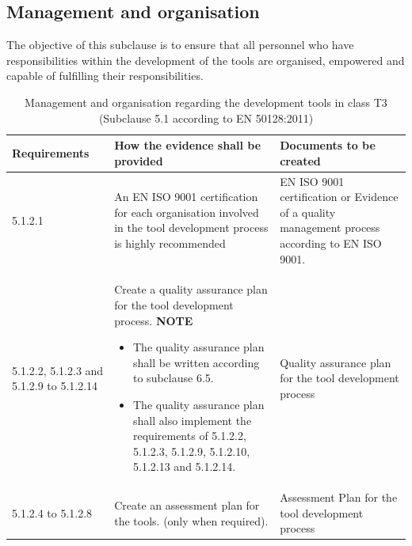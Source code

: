 \documentclass{template/openetcs_report}
\begin{document}
\subsection{Management and organisation}
The objective of this subclause is to ensure that all personnel who have responsibilities within the development of the tools are organised, empowered and capable of fulfilling their responsibilities.
{\footnotesize\sffamily\centering
\begin{longtable}{|p{2cm}|p{9cm}|p{3cm}|}
\caption{Management and organisation regarding the development tools in class T3 (Subclause 5.1 according to EN 50128:2011)}\\
\hline
\bfseries Requirements & \bfseries How the evidence shall be provided & \bfseries Documents to be created\\
\hline
\hline
\endhead
\hline
\endfoot

5.1.2.1 & An EN ISO 9001 certification for each organisation involved in the tool development process is highly recommended & EN ISO 9001 certification or Evidence of a quality management process according to EN ISO 9001.\\ 
\hline
5.1.2.2, 5.1.2.3 and 5.1.2.9 to 5.1.2.14 & Create a quality assurance plan for the tool development process. 
\linebreak
\linebreak
\textbf{NOTE }
\begin{itemize}\itemsep=0pt
  \item The quality assurance plan shall be written according to subclause 6.5.
  \item The quality assurance plan shall also implement the requirements of 5.1.2.2, 5.1.2.3, 5.1.2.9, 5.1.2.10, 5.1.2.13 and 5.1.2.14.
\end{itemize}
& Quality assurance plan for the tool development process\\ 
\hline
5.1.2.4 to 5.1.2.8 & Create an assessment plan for the tools. (only when required).
& Assessment Plan for the tool development process\\ 
\hline
\end{longtable}}
\end{document}
